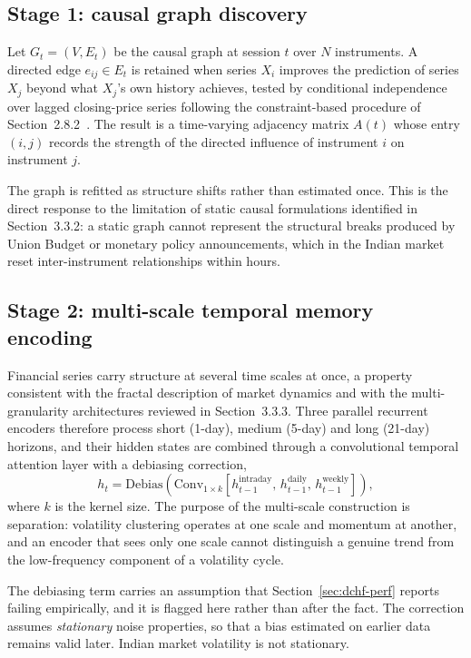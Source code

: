 \subsection{Stage 1: causal graph discovery}

Let $G_t = (V, E_t)$ be the causal graph at session $t$ over $N$ instruments. A directed edge
$e_{ij} \in E_t$ is retained when series $X_i$ improves the prediction of series $X_j$ beyond
what $X_j$'s own history achieves, tested by conditional independence over lagged closing-price
series following the constraint-based procedure of Section~2.8.2~\cite{spirtes2000,granger1969}.
The result is a time-varying adjacency matrix $A(t)$ whose entry $(i,j)$ records the strength of
the directed influence of instrument $i$ on instrument $j$.

The graph is refitted as structure shifts rather than estimated once. This is the direct response
to the limitation of static causal formulations identified in Section~3.3.2: a static graph cannot
represent the structural breaks produced by Union Budget or monetary policy announcements, which
in the Indian market reset inter-instrument relationships within hours.

\subsection{Stage 2: multi-scale temporal memory encoding}

Financial series carry structure at several time scales at once, a property consistent with the
fractal description of market dynamics and with the multi-granularity architectures reviewed in
Section~3.3.3. Three parallel recurrent encoders therefore process short (1-day), medium (5-day)
and long (21-day) horizons, and their hidden states are combined through a convolutional temporal
attention layer with a debiasing correction,
\begin{equation}
h_t = \mathrm{Debias}\!\left(\mathrm{Conv}_{1\times k}
\left[h^{\text{intraday}}_{t-1},\, h^{\text{daily}}_{t-1},\, h^{\text{weekly}}_{t-1}\right]\right),
\label{eq:mtmd}
\end{equation}
where $k$ is the kernel size. The purpose of the multi-scale construction is separation:
volatility clustering operates at one scale and momentum at another, and an encoder that sees only
one scale cannot distinguish a genuine trend from the low-frequency component of a
volatility cycle.

The debiasing term carries an assumption that Section~\ref{sec:dchf-perf} reports failing
empirically, and it is flagged here rather than after the fact. The correction assumes
\emph{stationary} noise properties, so that a bias estimated on earlier data remains valid later.
Indian market volatility is not stationary.


